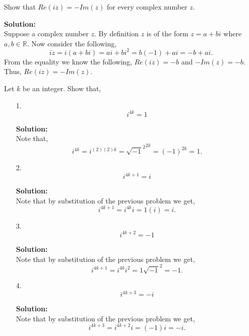 \documentclass[12pt]{article}
\makeatletter
\theoremstyle{homework}
\newenvironment{exercise}[1]
{\def\@currentlabel{#1}\exercisecore}
{\endexercisecore}
\newcommand{\localhead}[1]{\par\smallskip\noindent\textbf{#1}\nobreak\\}%
\newcommand\solution{\localhead{Solution:}}
\newcommand{\Reals}{\ensuremath{\mathbb R}}
\let\RR\Reals
\makeatother
\begin{document}
\begin{exercise}{14} Show that $Re(iz) = -Im(z)$ for every complex number $z$.\\
    \solution Suppose a complex number $z$. By definition $z$ is of the form $z = a + bi$ where 
    $a, b \in \RR$. Now consider the following, 
    \begin{equation*}
        iz = i(a + bi) = ai + bi^2 = b(-1) + ai = -b + ai.
    \end{equation*}
    From the equality we know the following, $Re(iz) = -b$ and $-Im(z) = -b$. Thus, $Re(iz) = -Im(z)$.
\end{exercise}
\vspace{1in}


\begin{exercise}{15} Let $k$ be an integer. Show that, 
    \begin{enumerate}
    \item[1.] 
    \begin{equation*}
        i^{4k} = 1
    \end{equation*}
    \solution Note that, 
    \begin{equation*}
        i^{4k} =  i^{(2)(2)k} =  {\sqrt{-1}^2}^{2k} = (-1)^{2k} = 1.  
    \end{equation*}
    \vspace{.15in}

    \item[2.]
    \begin{equation*}
        i^{4k + 1} = i
    \end{equation*}
    \solution Note that by substitution of the previous problem we get, 
    \begin{equation*}
        i^{4k + 1} = i^{4k}i = 1(i) = i. 
    \end{equation*}
    \vspace{.15in}


    \item[3.]
    \begin{equation*}
        i^{4k + 2} = -1
    \end{equation*}
    \solution Note that by substitution of the previous problem we get, 
    \begin{equation*}
        i^{4k + 1} = i^{4k}i^2 = 1\sqrt{-1}^2 = -1. 
    \end{equation*}
    \vspace{.15in}

    \item[4.]
    \begin{equation*}
        i^{4k + 3} = -i
    \end{equation*}
    \solution Note that by substitution of the previous problem we get, 
    \begin{equation*}
        i^{4k + 3} = i^{4k + 2}i = (-1)i = -i. 
    \end{equation*}
\end{enumerate}
\end{exercise}
\vspace{1in}
\end{document}
